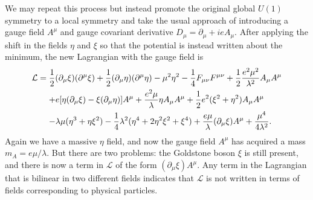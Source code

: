 We may repeat this process but instead promote the original global $U(1)$ symmetry to a local symmetry and take the usual approach of introducing a gauge field $A^\mu$ and gauge covariant derivative $D_\mu=\partial_\mu+ieA_\mu$.
After applying the shift in the fields $\eta$ and $\xi$ so that the potential is instead written about the minimum, the new Lagrangian with the gauge field is
\begin{equation}
  \begin{aligned}
    \mathcal{L} &= \frac{1}{2}(\partial_\mu\xi)(\partial^\mu\xi)+\frac{1}{2}(\partial_\mu\eta)(\partial^\mu\eta)-\mu^2\eta^2-\frac{1}{4}F_{\mu\nu}F^{\mu\nu}+\frac{1}{2}\frac{e^2\mu^2}{\lambda^2}A_\mu A^\mu\\
    &\equad+ e[\eta(\partial_\mu\xi)-\xi(\partial_\mu\eta)]A^\mu+\frac{e^2\mu}{\lambda}\eta A_\mu A^\mu+\frac{1}{2}e^2(\xi^2+\eta^2)A_\mu A^\mu\\
    &\equad- \lambda\mu(\eta^3+\eta\xi^2)-\frac{1}{4}\lambda^2(\eta^4+2\eta^2\xi^2+\xi^4)+\frac{e\mu}{\lambda}(\partial_\mu\xi)A^\mu+\frac{\mu^4}{4\lambda^2}.
  \end{aligned}
\end{equation}
Again we have a massive $\eta$ field, and now the gauge field $A^\mu$ has acquired a mass $m_A=e\mu/\lambda$.
But there are two problems: the Goldstone boson $\xi$ is still present, and there is now a term in $\mathcal{L}$ of the form $(\partial_\mu\xi)A^\mu$.
Any term in the Lagrangian that is bilinear in two different fields indicates that $\mathcal{L}$ is not written in terms of fields corresponding to physical particles.

